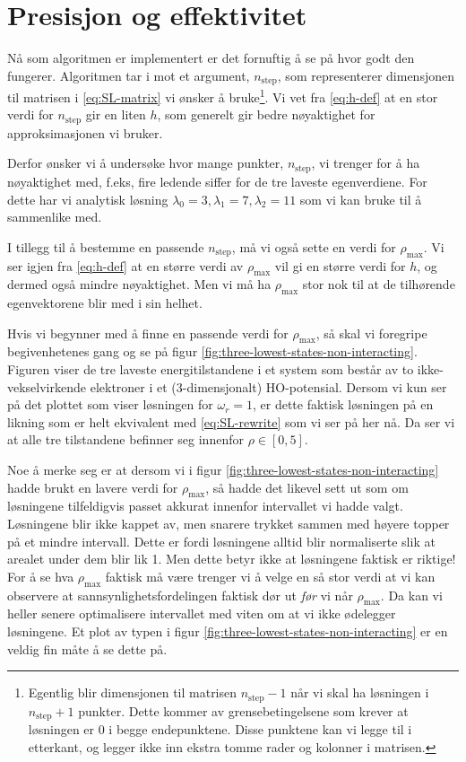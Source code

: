 \documentclass[11pt]{article}
\begin{document}
\section{Presisjon og effektivitet}
Nå som algoritmen er implementert er det fornuftig å se på hvor godt
den fungerer. Algoritmen tar i mot et argument, $n_{\text{step}}$, som
representerer dimensjonen til matrisen i \eqref{eq:SL-matrix} vi
ønsker å bruke\footnote{Egentlig blir dimensjonen til matrisen
  $n_\text{step}-1$ når vi skal ha løsningen i $n_\text{step}+1$
  punkter. Dette kommer av grensebetingelsene som krever at løsningen
  er 0 i begge endepunktene. Disse punktene kan vi legge til i
  etterkant, og legger ikke inn ekstra tomme rader og kolonner i
  matrisen.}. Vi vet fra \eqref{eq:h-def} at en stor verdi for
$n_\text{step}$ gir en liten $h$, som generelt gir bedre nøyaktighet
for approksimasjonen vi bruker.  

Derfor ønsker vi å undersøke hvor mange punkter, $n_\text{step}$, vi
trenger for å ha nøyaktighet med, f.eks, fire ledende siffer for de
tre laveste egenverdiene. For dette har vi analytisk løsning $\lambda_0=3,\lambda_1=7,\lambda_2=11$ som vi kan bruke til å
sammenlike med. 

I tillegg til å bestemme en passende
$n_\text{step}$, må vi også sette en verdi for $\rho_\text{max}$. Vi
ser igjen fra \eqref{eq:h-def} at en større verdi av $\rho_\text{max}$
vil gi en større verdi for $h$, og dermed også mindre nøyaktighet. Men
vi må ha $\rho_\text{max}$ stor nok til at de tilhørende egenvektorene
blir med i sin helhet. 

Hvis vi begynner med å finne en passende verdi for $\rho_\text{max}$,
så skal vi foregripe begivenhetenes gang og se på figur  %
\ref{fig:three-lowest-states-non-interacting}. Figuren viser de tre
laveste energitilstandene i et system som består av to
ikke-vekselvirkende elektroner i et (3-dimensjonalt)
HO-potensial. Dersom vi kun ser på det plottet som viser løsningen for
$\omega_r=1$, er dette faktisk løsningen på en likning som er helt
ekvivalent med \eqref{eq:SL-rewrite} som vi ser på her nå. Da ser vi
at alle tre tilstandene befinner seg innenfor $\rho\in[0,5]$. 

Noe å merke seg er at dersom vi i figur
\ref{fig:three-lowest-states-non-interacting} hadde brukt en lavere
verdi for $\rho_\text{max}$, så hadde det likevel sett ut som om
løsningene tilfeldigvis passet akkurat innenfor intervallet vi hadde
valgt. Løsningene blir ikke kappet av, men snarere trykket sammen med
høyere topper på et mindre intervall. Dette er fordi løsningene alltid
blir normaliserte slik at arealet under dem blir lik 1. Men dette
betyr ikke at løsningene faktisk er riktige! For å se hva
$\rho_\text{max}$ faktisk må være trenger vi å velge en så stor verdi
at vi kan observere at sannsynlighetsfordelingen faktisk dør ut
\emph{før} vi når $\rho_\text{max}$. Da kan vi heller senere
optimalisere intervallet med viten om at vi ikke ødelegger
løsningene. Et plot av typen i figur
\ref{fig:three-lowest-states-non-interacting} er en veldig fin måte å
se dette på. 
\end{document}
